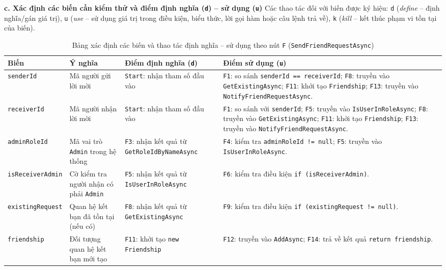 \documentclass[11pt,a4paper]{article}
\begin{document}
\noindent\textbf{c. Xác định các biến cần kiểm thử và điểm định nghĩa (\texttt{d}) -- sử dụng (\texttt{u})}
Các thao tác đối với biến được ký hiệu: \texttt{d} (\textit{define} -- định nghĩa/gán giá trị), \texttt{u} (\textit{use} -- sử dụng giá trị trong điều kiện, biểu thức, lời gọi hàm hoặc câu lệnh trả về), \texttt{k} (\textit{kill} -- kết thúc phạm vi tồn tại của biến).

\begin{table}[H]
\centering
\scriptsize
\begin{tabularx}{\textwidth}{|L{2.3cm}|L{3.1cm}|L{3.2cm}|X|}
\hline
{}
\textbf{Biến} & \textbf{Ý nghĩa} & \textbf{Điểm định nghĩa (\texttt{d})} & \textbf{Điểm sử dụng (\texttt{u})} \tabularnewline
\hline
\texttt{senderId} & Mã người gửi lời mời & \texttt{Start}: nhận tham số đầu vào & \texttt{F1}: so sánh \texttt{senderId == receiverId}; \texttt{F8}: truyền vào \texttt{GetExistingAsync}; \texttt{F11}: khởi tạo \texttt{Friendship}; \texttt{F13}: truyền vào \texttt{NotifyFriendRequestAsync}. \\ \hline
\texttt{receiverId} & Mã người nhận lời mời & \texttt{Start}: nhận tham số đầu vào & \texttt{F1}: so sánh với \texttt{senderId}; \texttt{F5}: truyền vào \texttt{IsUserInRoleAsync}; \texttt{F8}: truyền vào \texttt{GetExistingAsync}; \texttt{F11}: khởi tạo \texttt{Friendship}; \texttt{F13}: truyền vào \texttt{NotifyFriendRequestAsync}. \\ \hline
\texttt{adminRoleId} & Mã vai trò \texttt{Admin} trong hệ thống & \texttt{F3}: nhận kết quả từ \texttt{GetRoleIdByNameAsync} & \texttt{F4}: kiểm tra \texttt{adminRoleId != null}; \texttt{F5}: truyền vào \texttt{IsUserInRoleAsync}. \\ \hline
\texttt{isReceiverAdmin} & Cờ kiểm tra người nhận có phải \texttt{Admin} & \texttt{F5}: nhận kết quả từ \texttt{IsUserInRoleAsync} & \texttt{F6}: kiểm tra điều kiện \texttt{if (isReceiverAdmin)}. \\ \hline
\texttt{existingRequest} & Quan hệ kết bạn đã tồn tại (nếu có) & \texttt{F8}: nhận kết quả từ \texttt{GetExistingAsync} & \texttt{F9}: kiểm tra điều kiện \texttt{if (existingRequest != null)}. \\ \hline
\texttt{friendship} & Đối tượng quan hệ kết bạn mới tạo & \texttt{F11}: khởi tạo \texttt{new Friendship} & \texttt{F12}: truyền vào \texttt{AddAsync}; \texttt{F14}: trả về kết quả \texttt{return friendship}. \\ \hline
\end{tabularx}
\caption{Bảng xác định các biến và thao tác định nghĩa -- sử dụng theo nút \texttt{F} (\texttt{SendFriendRequestAsync})}
\end{table}
\end{document}
